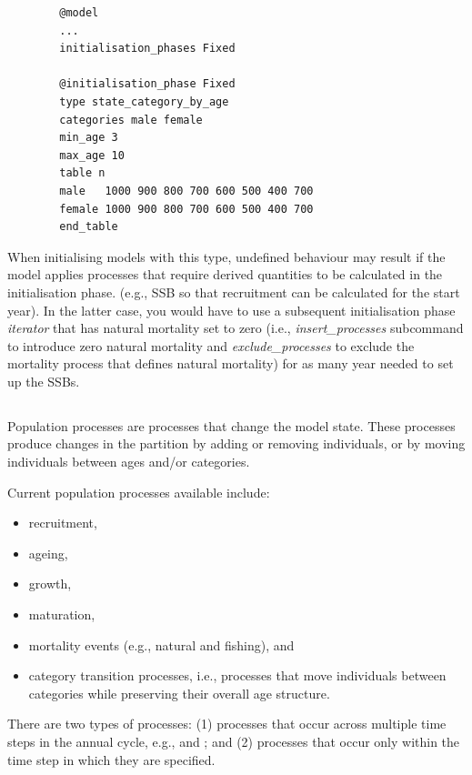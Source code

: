 {\small{\begin{verbatim}
		@model
		...
		initialisation_phases Fixed

		@initialisation_phase Fixed
		type state_category_by_age
		categories male female
		min_age 3
		max_age 10
		table n
		male   1000 900 800 700 600 500 400 700
		female 1000 900 800 700 600 500 400 700
		end_table
		\end{verbatim}}}

When initialising models with this type, undefined behaviour may result if the model applies processes that require derived quantities to be calculated in the initialisation phase. (e.g., SSB so that recruitment can be calculated for the start year). In the latter case, you would have to use a subsequent initialisation phase \textit{iterator} that has natural mortality set to zero (i.e., \textit{insert\_processes} subcommand to introduce zero natural mortality and \textit{exclude\_processes} to exclude the mortality process that defines natural mortality) for as many year needed to set up the SSBs.


\subsection{}\label{sec:Process}

Population processes are processes that change the model state. These processes produce changes in the partition by adding or removing individuals, or by moving individuals between ages and/or categories.

Current population processes available include:

\begin{itemize}
\item recruitment,
\item ageing,
\item growth,
\item maturation,
\item mortality events (e.g., natural and fishing), and
\item category transition processes, i.e., processes that move individuals between categories while preserving their overall age structure.
\end{itemize}

There are two types of processes: (1) processes that occur across multiple time steps in the annual cycle, e.g.,  and ; and (2) processes that occur only within the time step in which they are specified.

